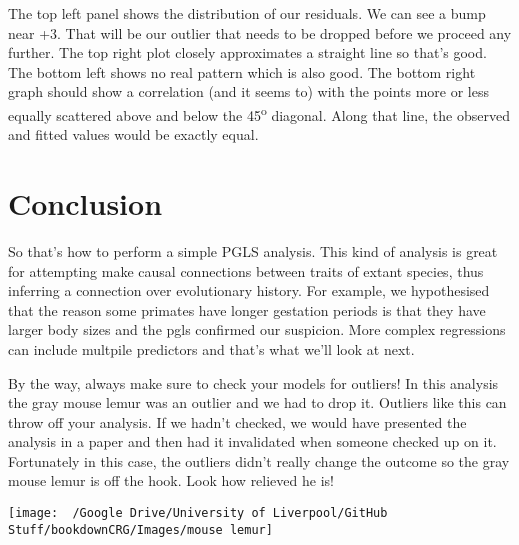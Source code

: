 \documentclass[]{book}
\begin{document}
The top left panel shows the distribution of our residuals. We can see a
bump near +3. That will be our outlier that needs to be dropped before
we proceed any further. The top right plot closely approximates a
straight line so that's good. The bottom left shows no real pattern
which is also good. The bottom right graph should show a correlation
(and it seems to) with the points more or less equally scattered above
and below the 45\textsuperscript{o} diagonal. Along that line, the
observed and fitted values would be exactly equal.

\section{Conclusion}\label{conclusion}

So that's how to perform a simple PGLS analysis. This kind of analysis
is great for attempting make causal connections between traits of extant
species, thus inferring a connection over evolutionary history. For
example, we hypothesised that the reason some primates have longer
gestation periods is that they have larger body sizes and the pgls
confirmed our suspicion. More complex regressions can include multpile
predictors and that's what we'll look at next.

By the way, always make sure to check your models for outliers! In this
analysis the gray mouse lemur was an outlier and we had to drop it.
Outliers like this can throw off your analysis. If we hadn't checked, we
would have presented the analysis in a paper and then had it invalidated
when someone checked up on it. Fortunately in this case, the outliers
didn't really change the outcome so the gray mouse lemur is off the
hook. Look how relieved he is!

\begin{center}\texttt{[image: ~/Google Drive/University of Liverpool/GitHub Stuff/bookdownCRG/Images/mouse lemur]} \end{center}


\end{document}

